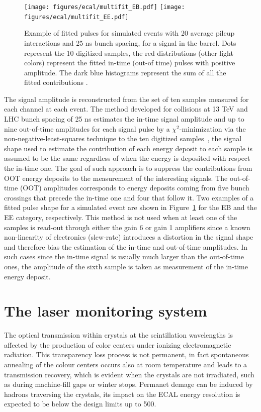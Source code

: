 \begin{figure}[!h]
  \centering
  \texttt{[image: figures/ecal/multifit\_EB.pdf]}
  \texttt{[image: figures/ecal/multifit\_EE.pdf]}
  \caption{Example of fitted pulses for simulated events with 20 average pileup interactions and 25 ns bunch spacing, for a signal in the barrel. Dots represent the 10 digitized samples, the red distributions (other light colors) represent the fitted in-time (out-of time) pulses with positive amplitude. The dark blue histograms represent the sum of all the fitted contributions \cite{Multifit}.}
  \label{fig:multifit_for_dummies}
\end{figure}

The signal amplitude is reconstructed from the set of ten samples measured for each channel at each event.
The method developed for collisions at 13 TeV and LHC bunch spacing of 25 ns estimates
the in-time signal amplitude and up to nine out-of-time
amplitudes for each signal pulse by a $\chi^2$-minimization via the non-negative-least-squares
technique to the ten digitized samples~\cite{Multifit}, the signal shape used to estimate the contribution of each
energy deposit to each sample is assumed to be the same regardless of when the energy is deposited with respect
the in-time one.
The goal of such approach is to suppress the contributions from OOT energy deposits
to the measurement of the interesting signals.
The out-of-time (OOT) amplitudes corresponds to
energy deposits coming from five bunch crossings that precede the in-time one and four that follow it.
Two examples of a fitted pulse shape for
a simulated event are shown in Figure~\ref{fig:multifit_for_dummies} for the EB and the EE category, respectively.
This method is not used when at least one of the samples is read-out through either the gain 6 or gain 1
amplifiers since a known non-linearity of electronics (slew-rate) introduces a distortion in the signal shape
and therefore bias the estimation of the in-time and out-of-time amplitudes.
In such cases since the in-time signal is usually much larger than the out-of-time ones,
the amplitude of the sixth sample is taken as measurement of the in-time energy deposit.

\section{The laser monitoring system}
\label{sec:laser}
The optical transmission within crystals at the scintillation wavelengths is affected by the production
of color centers under ionizing electromagnetic radiation. This transparency loss process is not permanent,
in fact spontaneous annealing of the colour centers occurs also at room temperature and leads
to a transmission recovery, which is evident when the crystals are not irradiated, such as during
machine-fill gaps or winter stops.
Permanet demage can be induced by hadrons traversing the crystals, its impact on the ECAL energy resolution
is expected to be below the design limits up to 500\fbinv.


